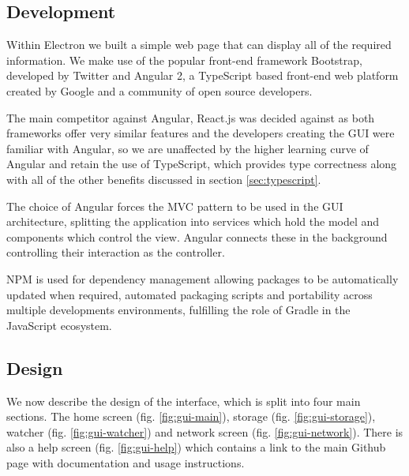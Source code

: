 \documentclass[11pt, a4paper, twoside]{report}
\begin{document}
\subsection{Development}

Within Electron we built a simple web page that can display all of the required information. We make use of the popular front-end framework Bootstrap, developed by Twitter and Angular 2, a TypeScript based front-end web platform created by Google and a community of open source developers.

The main competitor against Angular, React.js was decided against as both frameworks offer very similar features and the developers creating the GUI were familiar with Angular, so we are unaffected by the higher learning curve of Angular \citep{house2016ng2react} and retain the use of TypeScript, which provides type correctness along with all of the other benefits discussed in section \ref{sec:typescript}.

The choice of Angular forces the MVC pattern to be used in the GUI architecture, splitting the application into services which hold the model and components which control the view. Angular connects these in the background controlling their interaction as the controller.

NPM is used for dependency management allowing packages to be automatically updated when required, automated packaging scripts and portability across multiple developments environments, fulfilling the role of Gradle in the JavaScript ecosystem.

\subsection{Design}

We now describe the design of the interface, which is split into four main sections. The home screen (fig. \ref{fig:gui-main}), storage (fig. \ref{fig:gui-storage}), watcher (fig. \ref{fig:gui-watcher}) and network screen (fig. \ref{fig:gui-network}). There is also a help screen (fig. \ref{fig:gui-help}) which contains a link to the main Github page with documentation and usage instructions.
\end{document}
